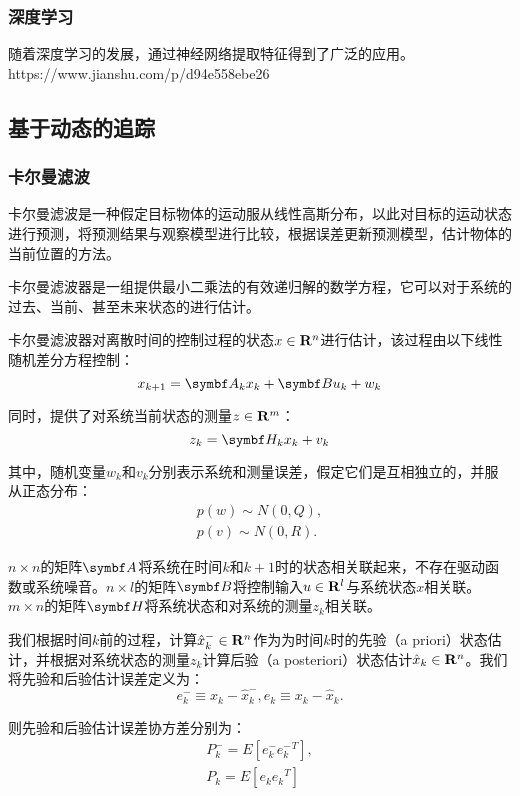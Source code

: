 \subsubsection{深度学习}
  随着深度学习的发展，通过神经网络提取特征得到了广泛的应用。https://www.jianshu.com/p/d94e558ebe26

\subsection{基于动态的追踪}
\subsubsection{卡尔曼滤波}

  卡尔曼滤波是一种假定目标物体的运动服从线性高斯分布，以此对目标的运动状态进行预测，将预测结果与观察模型进行比较，根据误差更新预测模型，估计物体的当前位置的方法。
  
  卡尔曼滤波器是一组提供最小二乘法的有效递归解的数学方程，它可以对于系统的过去、当前、甚至未来状态的进行估计\cite{welch1995introduction}。

  卡尔曼滤波器对离散时间的控制过程的状态$x\in \mathbf{R}^n$进行估计，该过程由以下线性随机差分方程控制：
$$x_{k+1}=\mat{A}_k x_k + \mat{B} u_k + w_k$$

  同时，提供了对系统当前状态的测量$z\in \mathbf{R}^m$：
$$z_k=\mat{H}_k x_k + v_k$$

  其中，随机变量$w_k$和$v_k$分别表示系统和测量误差，假定它们是互相独立的，并服从正态分布：
\begin{gather*}
p(w)\sim N(0,Q),\\
p(v)\sim N(0,R).
\end{gather*}
  
  $n\times n$的矩阵$\mat{A}$将系统在时间$k$和$k+1$时的状态相关联起来，不存在驱动函数或系统噪音。$n\times l$的矩阵$\mat{B}$将控制输入$u\in \mathbf{R}^l$与系统状态$x$相关联。$m\times n$的矩阵$\mat{H}$将系统状态和对系统的测量$z_k$相关联。

  我们根据时间$k$前的过程，计算$\hat{x}^{-}_k \in \mathbf{R}^n$作为为时间$k$时的先验（a priori）状态估计，并根据对系统状态的测量$z_k$计算后验（a posteriori）状态估计$\hat{x}_k \in \mathbf{R}^n$。我们将先验和后验估计误差定义为：
$$e^{-}_k \equiv x_k -\hat{x}^{-}_k, e_k \equiv x_k - \hat{x}_k. $$

  则先验和后验估计误差协方差分别为：
\begin{gather*}
P^{-}_k = E[e^{-}_k {e^{-}_k}^T],\\
P_k=E[e_k {e_k}^T]
\end{gather*}

